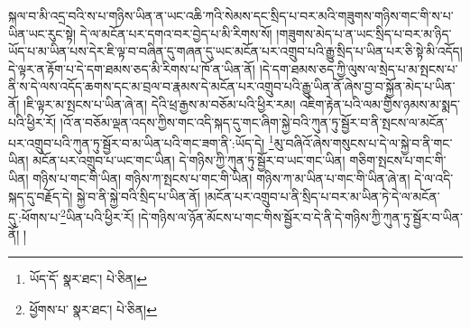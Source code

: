 སྐལ་བ་མི་འདྲ་བའི་ས་པ་གཉིས་ཡིན་ན་ཡང་འཆི་ཀའི་སེམས་དང་སྲིད་པ་བར་མའི་གཟུགས་གཉིས་གང་གི་ས་པ་ཡིན་ཡང་རུང་སྟེ། དེ་ལ་མངོན་པར་དགའ་བར་བྱེད་པ་མི་རིགས་སོ། །གཟུགས་མེད་པ་ན་ཡང་སྲིད་པ་བར་མ་ཉིད་ཡོད་པ་མ་ཡིན་པས་དེར་ཇི་ལྟ་བ་བཞིན་དུ་གཞན་དུ་ཡང་མངོན་པར་འགྲུབ་པའི་རྒྱུ་སྲིད་པ་ཡིན་པར་ཅི་སྟེ་མི་འདོད། དེ་ལྟར་ན་རྟོག་པ་དེ་དག་ཐམས་ཅད་མི་རིགས་པ་ཁོ་ན་ཡིན་ནོ། །དེ་དག་ཐམས་ཅད་ཀྱི་ལུས་ལ་སྲེད་པ་མ་སྤངས་པ་ནི་ས་དེ་ལས་འདོད་ཆགས་དང་མ་བྲལ་བ་རྣམས་དེ་མངོན་པར་འགྲུབ་པའི་རྒྱུ་ཡིན་ནོ་ཞེས་བྱ་བ་སྐྱོན་མེད་པ་ཡིན་ནོ། །ཇི་ལྟར་མ་སྤངས་པ་ཡིན་ཞེ་ན། དེའི་ཕྲ་རྒྱས་མ་བཅོམ་པའི་ཕྱིར་རམ། འཇིག་རྟེན་པའི་ལམ་གྱིས་ཉམས་མ་སྨད་པའི་ཕྱིར་རོ། །འོ་ན་བཅོམ་ལྡན་འདས་ཀྱིས་གང་འདི་སྐད་དུ་གང་ཞིག་སྐྱེ་བའི་ཀུན་ཏུ་སྦྱོར་བ་ནི་སྤངས་ལ་མངོན་པར་འགྲུབ་པའི་ཀུན་ཏུ་སྦྱོར་བ་མ་ཡིན་པའི་གང་ཟག་ནི་:ཡོད་དེ། \footnote{ཡོད་དོ་  སྣར་ཐང་།  པེ་ཅིན། }མུ་བཞིའོ་ཞེས་གསུངས་པ་དེ་ལ་སྐྱེ་བ་ནི་གང་ཡིན། མངོན་པར་འགྲུབ་པ་ཡང་གང་ཡིན། དེ་གཉིས་ཀྱི་ཀུན་ཏུ་སྦྱོར་བ་ཡང་གང་ཡིན། གཅིག་སྤངས་པ་གང་གི་ཡིན། གཉིས་པ་གང་གི་ཡིན། གཉིས་ཀ་སྤངས་པ་གང་གི་ཡིན། གཉིས་ཀ་མ་ཡིན་པ་གང་གི་ཡིན་ཞེ་ན། དེ་ལ་འདི་སྐད་དུ་བརྗོད་དེ། སྐྱེ་བ་ནི་སྐྱེ་བའི་སྲིད་པ་ཡིན་ནོ། །མངོན་པར་འགྲུབ་པ་ནི་སྲིད་པ་བར་མ་ཡིན་ཏེ་དེ་ལ་མངོན་དུ་:ཕོགས་པ་\footnote{ཕྱོགས་པ་  སྣར་ཐང་།  པེ་ཅིན། }ཡིན་པའི་ཕྱིར་རོ། །དེ་གཉིས་ལ་ཉོན་མོངས་པ་གང་གིས་སྦྱོར་བ་དེ་ནི་དེ་གཉིས་ཀྱི་ཀུན་ཏུ་སྦྱོར་བ་ཡིན་ནོ། །
